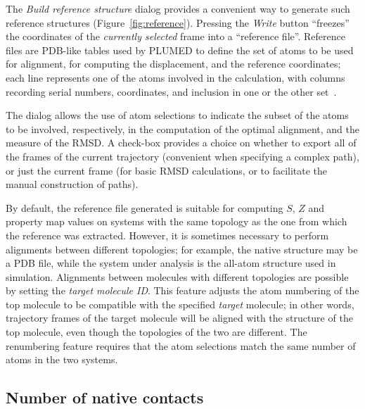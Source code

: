 \documentclass[preprint,review,11pt]{elsarticle}
\begin{document}

The \emph{Build reference structure} dialog provides a convenient way
to generate such reference structures (Figure~\ref{fig:reference}).
Pressing the \emph{Write} button ``freezes'' the coordinates of the
\emph{currently selected} frame into a ``reference file''.  Reference
files are PDB-like tables used by PLUMED to define the set of atoms to
be used for alignment, for computing the displacement, and the
reference coordinates; each line represents one of the atoms involved
in the calculation, with columns recording serial numbers,
coordinates, and inclusion in one or the other
set~\cite{plumed_manual}.  


The dialog allows the use of atom selections to indicate the subset of
the atoms to be involved, respectively, in the computation of the
optimal alignment, and the measure of the RMSD. A check-box provides
a choice on whether to export all of the frames of the current
trajectory (convenient when specifying a complex path), or just the
current frame (for basic RMSD calculations, or to facilitate the
manual construction of paths).

By default, the reference file generated is suitable for computing
$S$, $Z$ and property map values on systems with the same topology as the
one from which the reference was extracted.  However, it is sometimes
necessary to perform alignments between different topologies; for example, the
native structure may be a PDB file, while the system
under analysis is the all-atom structure used in
simulation. Alignments between molecules with different topologies are
possible by setting the \emph{target molecule ID}. This feature adjusts
the atom numbering of the top molecule to be compatible with the
specified \emph{target} molecule; in other words, trajectory frames of
the target molecule will be aligned with the structure of the top
molecule, even though the topologies of the two are different. The
renumbering feature requires that the atom selections match the same
number of atoms in the two systems.





\subsection{Number of native contacts}
\end{document}
